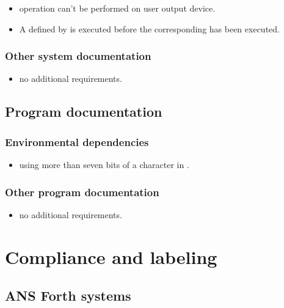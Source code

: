 \begin{itemize}
\item {} operation can't be performed on
	user output device.

\item A  defined by
	is executed before the corresponding
	has been executed.
\end{itemize}

\subsubsection{Other system documentation} %

\begin{itemize}
\item no additional requirements.
\end{itemize}

\subsection{Program documentation} %

\subsubsection{Environmental dependencies} %

\begin{itemize}
\item using more than seven bits of a character in
	.
\end{itemize}

\subsubsection{Other program documentation} %

\begin{itemize}
\item no additional requirements.
\end{itemize}

\section{Compliance and labeling} %

\subsection{ANS Forth systems} %

